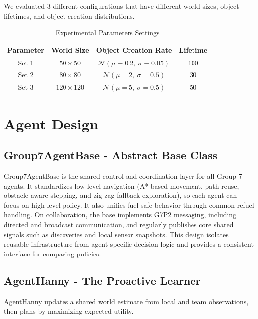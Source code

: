 \documentclass{article}
\begin{document}
We evaluated 3 different configurations that have different world sizes, object lifetimes, and object creation distributions. \\
\begin{table}[h]
\centering
\caption{Experimental Parameters Settings}
\label{tab:parameter-settings}
\begin{tabular}{|c|c|c|c|}
\hline
\textbf{Parameter} & \textbf{World Size} & \textbf{Object Creation Rate} & \textbf{Lifetime} \\
\hline
Set 1 & $50 \times 50$ & $\mathcal{N}(\mu=0.2,\ \sigma=0.05)$ & 100 \\
\hline
Set 2 & $80 \times 80$ & $\mathcal{N}(\mu=2,\ \sigma=0.5)$ & 30 \\
\hline
Set 3 & $120 \times 120$ & $\mathcal{N}(\mu=5,\ \sigma=0.5)$ & 50 \\
\hline
\end{tabular}
\end{table}

\section{Agent Design}

\subsection{Group7AgentBase - Abstract Base Class}

Group7AgentBase is the shared control and coordination layer for all Group 7 agents.
It standardizes low-level navigation (A*-based movement, path reuse, obstacle-aware stepping, and zig-zag fallback exploration), so each agent can focus on high-level policy.
It also unifies fuel-safe behavior through common refuel handling.
On collaboration, the base implements G7P2 messaging, including directed and broadcast communication, and regularly publishes core shared signals such as discoveries and local sensor snapshots.
This design isolates reusable infrastructure from agent-specific decision logic and provides a consistent interface for comparing policies.

\subsection{AgentHanny - The Proactive Learner}

AgentHanny updates a shared world estimate from local and team observations, then plans by maximizing expected utility.
\end{document}
